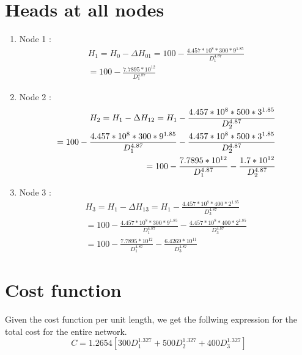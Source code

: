 \documentclass[10pt,a4paper]{article}
\begin{document}
\section{Heads at all nodes}
\begin{enumerate}
\item Node 1 :  
  \begin{equation}
   \begin{split}  
  H_1 = H_0 - \Delta H_{01} 
      = 100-\frac{4.457*10^8*300*9^{1.85}}{D_1^{4.87}} 
    \\  = 100-\frac{7.7895*10^{12}}{D_1^{4.87}}   
 \end{split} 
 \end{equation}

\item Node 2 :
\begin{equation} \begin{split}
 \newline  H_2 = H_1 - \Delta H_{12}    = H_1 - \frac{4.457*10^8*500*3^{1.85}}{D_2^{4.87}} \\ 
   =100-\frac{4.457*10^8*300*9^{1.85}}{D_1^{4.87}}- \frac{4.457*10^8*500*3^{1.85}}{D_2^{4.87}} \\ = 100-\frac{7.7895*10^{12}}{D_1^{4.87}}  -  \frac{ 1.7*10^{ 12}}{D_2^{4.87}} 
 \end{split} 
 \end{equation}
\item Node 3 : 
 \begin{equation}
   \begin{split}     H_3 = H_1 - \Delta H_{13}  = H_1 - \frac{4.457*10^8*400*2^{1.85}}{D_3^{4.87}} \\ =100-\frac{4.457*10^8*300*9^{1.85}}{D_1^{4.87}}-   \frac{4.457*10^8*400*2^{1.85}}{D_3^{4.87}} \\ =  100-\frac{7.7895*10^{12}}{D_1^{4.87}}- \frac{ 6.4269*10^{ 11}}{D_3^{4.87}} 
\end{split} 
 \end{equation}
\end{enumerate}

\section{ Cost function}

Given the cost function per unit length, we get the follwing expression for the total cost for the entire network.
\begin{equation}
 C = 1.2654 [300D_1^{1.327} +500D_2^{1.327}+400D_3^{1.327}] 
 \end{equation}
 
\end{document}
